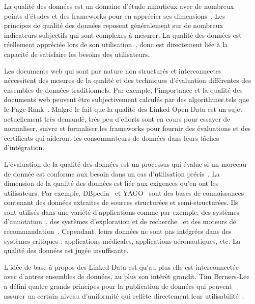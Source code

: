 La qualit\'{e} des donn\'{e}es est un domaine d'\'{e}tude minutieux avec de nombreux points d'\'{e}tudes et des frameworks pour en appr\'{e}cier ses dimensions~\cite{Kahn:ACM:02, Stvilia:ASIST:07, Wang:MIS:96}. Les principes de qualit\'{e} des donn\'{e}es reposent g\'{e}n\'{e}ralement sur de nombreux indicateurs subjectifs qui sont complexes \`{a} mesurer. La qualit\'{e} des donn\'{e}es est r\'{e}ellement appr\'{e}ci\'{e}e lors de son utilisation~\cite{Juran:McGraw:99}, donc est directement li\'{e}e \`{a} la capacit\'{e} de satisfaire les besoins des utilisateurs.

Les documents web qui sont par nature non structur\'{e}s et interconnectes n\'{e}cessitent des mesures de la qualit\'{e} et des techniques d'\'{e}valuation diff\'{e}rentes des ensembles de donn\'{e}es traditionnels. Par exemple, l'importance et la qualit\'{e} des documents web peuvent \^{e}tre subjectivement calcul\'{e}s par des algorithmes tels que le Page Rank~\cite{Page:TechReport:98}. Malgr\'{e} le fait que la qualit\'{e} des Linked Open Data est un sujet actuellement tr\`{e}s demand\'{e}, tr\`{e}s peu d'efforts sont en cours pour essayer de normaliser, suivre et formaliser les frameworks pour fournir des \'{e}valuations et des certificats qui aideront les consommateurs de donn\'{e}es dans leurs tâches d'int\'{e}gration.

L'\'{e}valuation de la qualit\'{e} des donn\'{e}es est un processus qui \'{e}value si un morceau de donn\'{e}e est conforme aux besoin dans un cas d'utilisation pr\'{e}cis~\cite{Bizer:WebSemantics:09}. La dimension de la qualit\'{e} des donn\'{e}es est li\'{e}e aux exigences qu'en ont les utilisateurs. Par exemple, DBpedia~\cite{Bizer:WebSemJorunal:09} et YAGO~\cite{Suchanek::WWW:07} sont des bases de connaissances contenant des donn\'{e}es extraites de sources structur\'{e}es et semi-structur\'{e}es. Ils sont utilis\'{e}s dans une vari\'{e}t\'{e} d'applications comme par exemple, des syst\`{e}mes d'annotation~\cite{Mendes:ICS:11}, des syst\`{e}mes d'exploration et de recherche~\cite{Marie:ICS:13} et des moteurs de recommandation~\cite{DiNoia:iSemantics:12}. Cependant, leurs donn\'{e}es ne sont pas int\'{e}gr\'{e}es dans des syst\`{e}mes critiques : applications m\'{e}dicales, applications a\'{e}ronautiques, etc. La qualit\'{e} des donn\'{e}es est jug\'{e}e insuffisante.

L'id\'{e}e de base \`{a} propos des Linked Data est qu'au plus elle est interconnect\'{e}e avec d'autres ensembles de donn\'{e}es, au plus son int\'{e}r\^{e}t grandit. Tim Berners-Lee a d\'{e}fini quatre grands principes pour la publication de donn\'{e}es qui peuvent assurer un certain niveau d'uniformit\'{e} qui refl\`{e}te directement leur utilisabilit\'{e}~\cite{Berners-Lee:W3C:06}:

